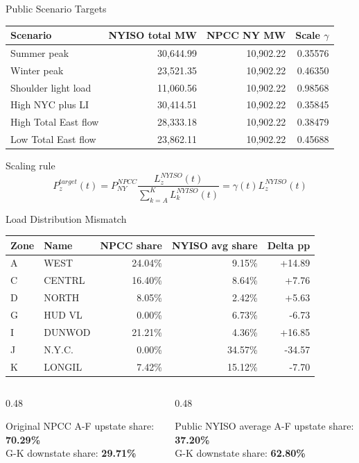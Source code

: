 \documentclass[aspectratio=169,10pt]{beamer}
\begin{document}
\begin{frame}{Public Scenario Targets}
\scriptsize
\begin{tabularx}{\linewidth}{l r r r}
\toprule
\textbf{Scenario} & \textbf{NYISO total MW} & \textbf{NPCC NY MW} & \textbf{Scale $\gamma$} \\
\midrule
Summer peak & 30,644.99 & 10,902.22 & 0.35576 \\
Winter peak & 23,521.35 & 10,902.22 & 0.46350 \\
Shoulder light load & 11,060.56 & 10,902.22 & 0.98568 \\
High NYC plus LI & 30,414.51 & 10,902.22 & 0.35845 \\
High Total East flow & 28,333.18 & 10,902.22 & 0.38479 \\
Low Total East flow & 23,862.11 & 10,902.22 & 0.45688 \\
\bottomrule
\end{tabularx}

\vspace{0.8em}
\begin{block}{Scaling rule}
\[
P_z^{target}(t) =
P_{NY}^{NPCC}
\frac{L_z^{NYISO}(t)}
{\sum_{k=A}^{K} L_k^{NYISO}(t)}
= \gamma(t) L_z^{NYISO}(t)
\]
\end{block}
\end{frame}

\begin{frame}{Load Distribution Mismatch}
\scriptsize
\begin{tabularx}{\linewidth}{l l r r r}
\toprule
\textbf{Zone} & \textbf{Name} & \textbf{NPCC share} & \textbf{NYISO avg share} & \textbf{Delta pp} \\
\midrule
A & WEST & 24.04\% & 9.15\% & +14.89 \\
C & CENTRL & 16.40\% & 8.64\% & +7.76 \\
D & NORTH & 8.05\% & 2.42\% & +5.63 \\
G & HUD VL & 0.00\% & 6.73\% & -6.73 \\
I & DUNWOD & 21.21\% & 4.36\% & +16.85 \\
J & N.Y.C. & 0.00\% & 34.57\% & -34.57 \\
K & LONGIL & 7.42\% & 15.12\% & -7.70 \\
\bottomrule
\end{tabularx}

\vspace{0.8em}
\begin{columns}[T]
\begin{column}{0.48\linewidth}
\begin{block}{Original NPCC}
A-F upstate share: \textbf{70.29\%}\\
G-K downstate share: \textbf{29.71\%}
\end{block}
\end{column}
\begin{column}{0.48\linewidth}
\begin{block}{Public NYISO average}
A-F upstate share: \textbf{37.20\%}\\
G-K downstate share: \textbf{62.80\%}
\end{block}
\end{column}
\end{columns}
\end{frame}
\end{document}
